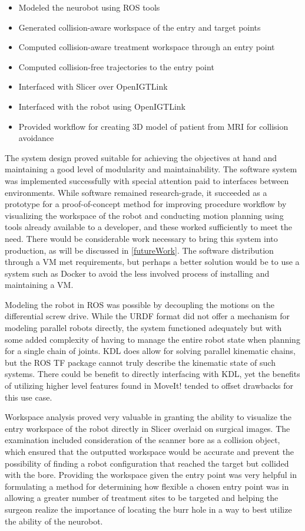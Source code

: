 \documentclass[12pt]{report}
\begin{document}
\singlespacing
\begin{itemize}
\item Modeled the neurobot using ROS tools
\item Generated collision-aware workspace of the entry and target points
\item Computed collision-aware treatment workspace through an entry point
\item Computed collision-free trajectories to the entry point
\item Interfaced with Slicer over OpenIGTLink
\item Interfaced with the robot using OpenIGTLink
\item Provided workflow for creating 3D model of patient from MRI for collision avoidance
\end{itemize}
\doublespacing

The system design proved suitable for achieving the objectives at hand and maintaining a good level of modularity and maintainability. The software system was implemented successfully with special attention paid to interfaces between environments. While software remained research-grade, it succeeded as a prototype for a proof-of-concept method for improving procedure workflow by visualizing the workspace of the robot and conducting motion planning using tools already available to a developer, and these worked sufficiently to meet the need. There would be considerable work necessary to bring this system into production, as will be discussed in \autoref{futureWork}. The software distribution through a VM met requirements, but perhaps a better solution would be to use a system such as Docker to avoid the less involved process of installing and maintaining a VM.

Modeling the robot in ROS was possible by decoupling the motions on the differential screw drive. While the URDF format did not offer a mechanism for modeling parallel robots directly, the system functioned adequately but with some added complexity of having to manage the entire robot state when planning for a single chain of joints. KDL does allow for solving parallel kinematic chains, but the ROS TF package cannot truly describe the kinematic state of such systems. \cite{kdl} There could be benefit to directly interfacing with KDL, yet the benefits of utilizing higher level features found in MoveIt! tended to offset drawbacks for this use case.

Workspace analysis proved very valuable in granting the ability to visualize the entry workspace of the robot directly in Slicer overlaid on surgical images. The examination included consideration of the scanner bore as a collision object, which ensured that the outputted workspace would be accurate and prevent the possibility of finding a robot configuration that reached the target but collided with the bore. Providing the workspace given the entry point was very helpful in formulating a method for determining how flexible a chosen entry point was in allowing a greater number of treatment sites to be targeted and helping the surgeon realize the importance of locating the burr hole in a way to best utilize the ability of the neurobot.
\end{document}
